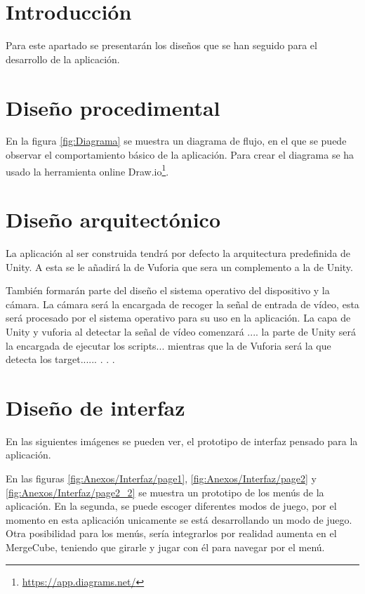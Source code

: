 
\section{Introducción}
 Para este apartado se presentarán los diseños que se han seguido para el desarrollo de la aplicación.
 

\section{Diseño procedimental}
En la figura  \ref{fig:Diagrama} se muestra un diagrama de flujo, en el que se puede observar el comportamiento básico de la aplicación. Para crear el diagrama se ha usado la herramienta online Draw.io\footnote{\url{https://app.diagrams.net/}}.

\section{Diseño arquitectónico}
La aplicación al ser construida tendrá por defecto la arquitectura predefinida de Unity. A esta se le añadirá la de Vuforia que sera un complemento a la de Unity.

También formarán parte del diseño el sistema operativo del dispositivo y la cámara. La cámara será la encargada de recoger la señal de entrada de vídeo, esta será procesado por el sistema operativo para su uso en la aplicación. La capa de Unity y vuforia al detectar la señal de vídeo comenzará .... la parte de Unity será la encargada de ejecutar los scripts... mientras que la de Vuforia será la que detecta los target......
.
.
.


\section{Diseño de interfaz}

En las siguientes imágenes se pueden ver, el prototipo de interfaz pensado para la aplicación. 

En las figuras \ref{fig:Anexos/Interfaz/page1}, \ref{fig:Anexos/Interfaz/page2} y \ref{fig:Anexos/Interfaz/page2_2} se muestra un prototipo de los menús de la aplicación. En la segunda, se puede escoger diferentes modos de juego, por el momento en esta aplicación unicamente se está desarrollando un modo de juego. 
Otra posibilidad para los menús, sería integrarlos por realidad aumenta en el MergeCube, teniendo que girarle y jugar con él para navegar por el menú.

